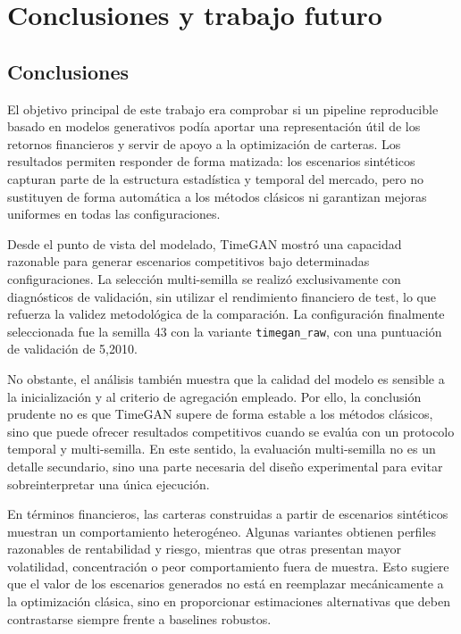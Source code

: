 \documentclass[11pt,a4paper,spanish,oneside]{book}
\numberwithin{equation}{chapter}
\numberwithin{figure}{chapter}
\begin{document}
\chapter{Conclusiones y trabajo futuro}

\section{Conclusiones}

El objetivo principal de este trabajo era comprobar si un pipeline reproducible basado en modelos generativos podía aportar una representación útil de los retornos financieros y servir de apoyo a la optimización de carteras. Los resultados permiten responder de forma matizada: los escenarios sintéticos capturan parte de la estructura estadística y temporal del mercado, pero no sustituyen de forma automática a los métodos clásicos ni garantizan mejoras uniformes en todas las configuraciones.

Desde el punto de vista del modelado, TimeGAN mostró una capacidad razonable para generar escenarios competitivos bajo determinadas configuraciones. La selección multi-semilla se realizó exclusivamente con diagnósticos de validación, sin utilizar el rendimiento financiero de test, lo que refuerza la validez metodológica de la comparación. La configuración finalmente seleccionada fue la semilla 43 con la variante \texttt{timegan\_raw}, con una puntuación de validación de 5,2010.

No obstante, el análisis también muestra que la calidad del modelo es sensible a la inicialización y al criterio de agregación empleado. Por ello, la conclusión prudente no es que TimeGAN supere de forma estable a los métodos clásicos, sino que puede ofrecer resultados competitivos cuando se evalúa con un protocolo temporal y multi-semilla. En este sentido, la evaluación multi-semilla no es un detalle secundario, sino una parte necesaria del diseño experimental para evitar sobreinterpretar una única ejecución.

En términos financieros, las carteras construidas a partir de escenarios sintéticos muestran un comportamiento heterogéneo. Algunas variantes obtienen perfiles razonables de rentabilidad y riesgo, mientras que otras presentan mayor volatilidad, concentración o peor comportamiento fuera de muestra. Esto sugiere que el valor de los escenarios generados no está en reemplazar mecánicamente a la optimización clásica, sino en proporcionar estimaciones alternativas que deben contrastarse siempre frente a baselines robustos.
\end{document}
